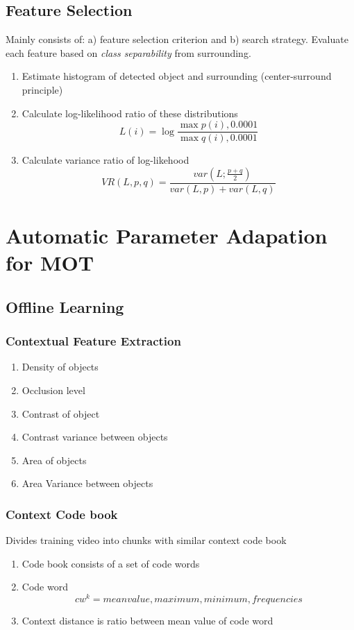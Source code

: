 \subsection{Feature Selection}
Mainly consists of: a) feature selection criterion and b) search strategy. Evaluate each feature based on \textit{class separability} from surrounding.

    \begin{enumerate}
        \item Estimate histogram of detected object and surrounding (center-surround principle)
        \item Calculate log-likelihood ratio of these distributions
        \[L(i) = \log \frac{\max{p(i), 0.0001}}{\max{q(i), 0.0001}}\]
        \item Calculate variance ratio of log-likehood 
        \[VR(L,p,q) = \frac{var(L;\frac{p+q}{2})}{var(L,p) + var(L, q)}\]
    \end{enumerate}
    
\section{Automatic Parameter Adapation for MOT} \cite{Chau2013}

\subsection{Offline Learning}

\subsubsection{Contextual Feature Extraction}
    \begin{enumerate}
        \item Density of objects
        \item Occlusion level
        \item Contrast of object
        \item Contrast variance between objects
        \item Area of objects
        \item Area Variance between objects
    \end{enumerate}
    
\subsubsection{Context Code book}
    Divides training video into chunks with similar context code book
    \begin{enumerate}
        \item Code book consists of a set of code words
        \item Code word 
            \[cw^{k} = {mean value, maximum, minimum, frequencies}\]
        \item Context distance is ratio between mean value of code word
    \end{enumerate}

